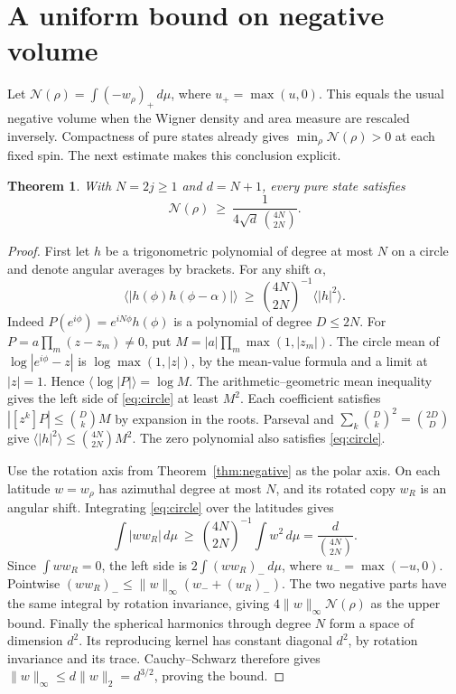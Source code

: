 \documentclass[10pt,a4paper]{article}
\newtheorem{theorem}{Theorem}
\newcommand{\norm}[1]{\lVert #1\rVert}
\begin{document}
\section{A uniform bound on negative volume}
Let \(\mathcal N(\rho)=\int (-w_\rho)_+\,d\mu\), where \(u_+=\max(u,0)\). This equals the usual negative volume when the Wigner density and area measure are rescaled inversely. Compactness of pure states already gives \(\min_\rho\mathcal N(\rho)>0\) at each fixed spin. The next estimate makes this conclusion explicit.

\begin{theorem}\label{thm:volume}
With \(N=2j\ge1\) and \(d=N+1\), every pure state satisfies
\[
 \mathcal N(\rho)\ \ge\ \frac{1}{4\sqrt d\,\binom{4N}{2N}}.
\]
\end{theorem}
\begin{proof}
First let \(h\) be a trigonometric polynomial of degree at most \(N\) on a circle and denote angular averages by brackets. For any shift \(\alpha\),
\begin{equation}\label{eq:circle}
 \big\langle |h(\phi)h(\phi-\alpha)|\big\rangle
 \ \ge\ \binom{4N}{2N}^{-1}\big\langle |h|^2\big\rangle .
\end{equation}
Indeed \(P(e^{i\phi})=e^{iN\phi}h(\phi)\) is a polynomial of degree \(D\le2N\). For \(P=a\prod_m(z-z_m)\ne0\), put \(M=|a|\prod_m\max(1,|z_m|)\). The circle mean of \(\log|e^{i\phi}-z|\) is \(\log\max(1,|z|)\), by the mean-value formula and a limit at \(|z|=1\). Hence \(\langle\log|P|\rangle=\log M\). The arithmetic--geometric mean inequality gives the left side of \eqref{eq:circle} at least \(M^2\). Each coefficient satisfies \(|[z^k]P|\le\binom Dk M\) by expansion in the roots. Parseval and \(\sum_k\binom Dk^2=\binom{2D}D\) give \(\langle|h|^2\rangle\le\binom{4N}{2N}M^2\). The zero polynomial also satisfies \eqref{eq:circle}.

Use the rotation axis from Theorem~\ref{thm:negative} as the polar axis. On each latitude \(w=w_\rho\) has azimuthal degree at most \(N\), and its rotated copy \(w_R\) is an angular shift. Integrating \eqref{eq:circle} over the latitudes gives
\[
 \int |ww_R|\,d\mu\ \ge\ \binom{4N}{2N}^{-1}\int w^2\,d\mu
 =\frac{d}{\binom{4N}{2N}}.
\]
Since \(\int ww_R=0\), the left side is \(2\int(ww_R)_-\,d\mu\), where \(u_-=\max(-u,0)\). Pointwise \((ww_R)_-\le\norm w_\infty(w_-+(w_R)_-)\). The two negative parts have the same integral by rotation invariance, giving \(4\norm w_\infty\mathcal N(\rho)\) as the upper bound. Finally the spherical harmonics through degree \(N\) form a space of dimension \(d^2\). Its reproducing kernel has constant diagonal \(d^2\), by rotation invariance and its trace. Cauchy--Schwarz therefore gives
\(\norm w_\infty\le d\norm w_2=d^{3/2}\), proving the bound.
\end{proof}
\end{document}
